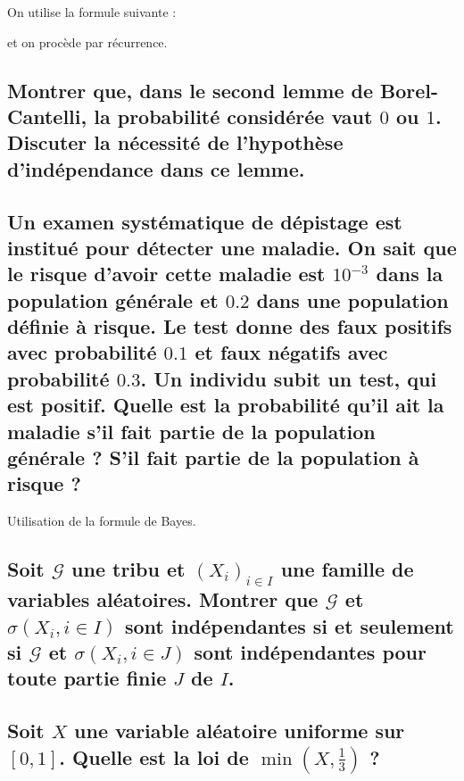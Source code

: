 \documentclass[a4paper, 10pt, oneside]{article}
\begin{document}
On utilise la formule suivante :

\begin{center}
\end{center}
et on procède par récurrence.

\subsection{Montrer que, dans le second lemme de Borel-Cantelli, la probabilité considérée vaut \texorpdfstring{$0$}{TEXT} ou \texorpdfstring{$1$}{TEXT}. Discuter la nécessité de l'hypothèse d'indépendance dans ce lemme.}

\begin{center}
\end{center}

\subsection{Un examen systématique de dépistage est institué pour détecter une maladie. On sait que le risque d'avoir cette maladie est \texorpdfstring{$10^{-3}$}{TEXT} dans la population générale et \texorpdfstring{$0.2$}{TEXT} dans une population définie à risque. Le test donne des faux positifs avec probabilité \texorpdfstring{$0.1$}{TEXT} et faux négatifs avec probabilité \texorpdfstring{$0.3$}{TEXT}. Un individu subit un test, qui est positif. Quelle est la probabilité qu'il ait la maladie s'il fait partie de la population générale ? S'il fait partie de la population à risque ?}

Utilisation de la formule de Bayes.

\subsection{Soit \texorpdfstring{$\mathcal{G}$}{TEXT} une tribu et \texorpdfstring{$(X_i)_{i\in I}$}{TEXT} une famille de variables aléatoires. Montrer que \texorpdfstring{$\mathcal{G}$}{TEXT} et \texorpdfstring{$\sigma(X_i,i\in I)$}{TEXT} sont indépendantes si et seulement si \texorpdfstring{$\mathcal{G}$}{TEXT} et \texorpdfstring{$\sigma(X_i,i\in J)$}{TEXT} sont indépendantes pour toute partie finie \texorpdfstring{$J$}{TEXT} de \texorpdfstring{$I$}{TEXT}.}

\subsection{Soit \texorpdfstring{$X$}{TEXT} une variable aléatoire uniforme sur \texorpdfstring{$[0,1]$}{TEXT}. Quelle est la loi de \texorpdfstring{$\min\left(X,\frac{1}{3}\right)$}{TEXT} ?}
\end{document}
